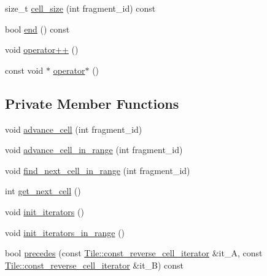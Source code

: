 \begin{DoxyCompactItemize}
\item 
size\+\_\+t \hyperlink{classStorageManager_1_1Array_1_1const__reverse__cell__iterator_aa8438b91cf2d63197c84544a6afe8f9b}{cell\+\_\+size} (int fragment\+\_\+id) const 
\item 
bool \hyperlink{classStorageManager_1_1Array_1_1const__reverse__cell__iterator_a97475a3e5aa93f64f9962d5dc39ff9f1}{end} () const 
\item 
void \hyperlink{classStorageManager_1_1Array_1_1const__reverse__cell__iterator_abb79b3277f6e49a03c0673c774c3c123}{operator++} ()
\item 
const void $\ast$ \hyperlink{classStorageManager_1_1Array_1_1const__reverse__cell__iterator_a477673a8462e6aa41d4ed8c8078dcd46}{operator$\ast$} ()
\end{DoxyCompactItemize}
\subsection*{Private Member Functions}
\begin{DoxyCompactItemize}
\item 
void \hyperlink{classStorageManager_1_1Array_1_1const__reverse__cell__iterator_aedaabb27f3c800ec4aee8fb1ee917b51}{advance\+\_\+cell} (int fragment\+\_\+id)
\item 
void \hyperlink{classStorageManager_1_1Array_1_1const__reverse__cell__iterator_aa36d101497be184e263d5a23774c974b}{advance\+\_\+cell\+\_\+in\+\_\+range} (int fragment\+\_\+id)
\item 
void \hyperlink{classStorageManager_1_1Array_1_1const__reverse__cell__iterator_ac6f63d1b1b268e5c3727d5df4395a94d}{find\+\_\+next\+\_\+cell\+\_\+in\+\_\+range} (int fragment\+\_\+id)
\item 
int \hyperlink{classStorageManager_1_1Array_1_1const__reverse__cell__iterator_a49f2ee1cea305bd1c4e3e939d191efa1}{get\+\_\+next\+\_\+cell} ()
\item 
void \hyperlink{classStorageManager_1_1Array_1_1const__reverse__cell__iterator_a0757d5ce0f03b978172a40b6d910dd25}{init\+\_\+iterators} ()
\item 
void \hyperlink{classStorageManager_1_1Array_1_1const__reverse__cell__iterator_aa029ee5fd04ddd1ba94f866a54c7870c}{init\+\_\+iterators\+\_\+in\+\_\+range} ()
\item 
bool \hyperlink{classStorageManager_1_1Array_1_1const__reverse__cell__iterator_a3a783504da48f6577a2ad5d1db556aed}{precedes} (const \hyperlink{classTile_1_1const__reverse__cell__iterator}{Tile\+::const\+\_\+reverse\+\_\+cell\+\_\+iterator} \&it\+\_\+\+A, const \hyperlink{classTile_1_1const__reverse__cell__iterator}{Tile\+::const\+\_\+reverse\+\_\+cell\+\_\+iterator} \&it\+\_\+\+B) const 
\end{DoxyCompactItemize}
